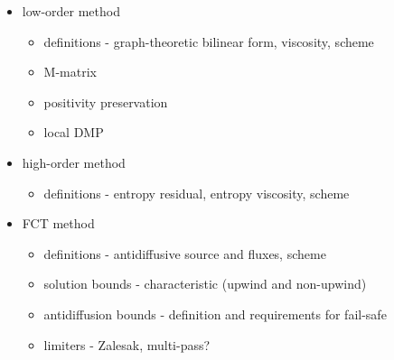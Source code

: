 \begin{itemize}
\item low-order method
  \begin{itemize}
    \item definitions - graph-theoretic bilinear form, viscosity, scheme
    \item M-matrix
    \item positivity preservation
    \item local DMP
  \end{itemize}
\item high-order method
  \begin{itemize}
    \item definitions - entropy residual, entropy viscosity, scheme
  \end{itemize}
\item FCT method
  \begin{itemize}
    \item definitions - antidiffusive source and fluxes, scheme
    \item solution bounds - characteristic (upwind and non-upwind)
    \item antidiffusion bounds - definition and requirements for fail-safe
    \item limiters - Zalesak, multi-pass?
  \end{itemize}
\end{itemize}
